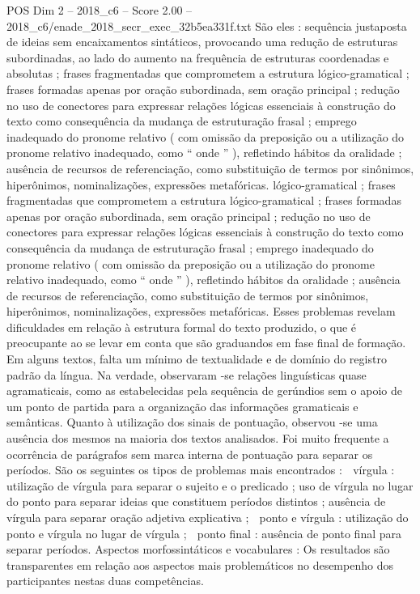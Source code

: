 \begin{textsample}{POS Dim 2 – 2018\_c6 – Score 2.00 – 2018\_c6/enade\_2018\_secr\_exec\_32b5ea331f.txt}
São eles : sequência justaposta de ideias sem encaixamentos sintáticos, provocando uma redução de estruturas subordinadas, ao lado do aumento na frequência de estruturas coordenadas e absolutas ; frases fragmentadas que comprometem a estrutura lógico-gramatical ; frases formadas apenas por oração subordinada, sem oração principal ; redução no uso de conectores para expressar relações lógicas essenciais à construção do texto como consequência da mudança de estruturação frasal ; emprego inadequado do pronome relativo ( com omissão da preposição ou a utilização do pronome relativo inadequado, como “ onde ” ), refletindo hábitos da oralidade ; ausência de recursos de referenciação, como substituição de termos por sinônimos, hiperônimos, nominalizações, expressões metafóricas. lógico-gramatical ; frases fragmentadas que comprometem a estrutura lógico-gramatical ; frases formadas apenas por oração subordinada, sem oração principal ; redução no uso de conectores para expressar relações lógicas essenciais à construção do texto como consequência da mudança de estruturação frasal ; emprego inadequado do pronome relativo ( com omissão da preposição ou a utilização do pronome relativo inadequado, como “ onde ” ), refletindo hábitos da oralidade ; ausência de recursos de referenciação, como substituição de termos por sinônimos, hiperônimos, nominalizações, expressões metafóricas.
Esses problemas revelam dificuldades em relação à estrutura formal do texto produzido, o que é preocupante ao se levar em conta que são graduandos em fase final de formação.
Em alguns textos, falta um mínimo de textualidade e de domínio do registro padrão da língua.
Na verdade, observaram -se relações linguísticas quase agramaticais, como as estabelecidas pela sequência de gerúndios sem o apoio de um ponto de partida para a organização das informações gramaticais e semânticas.
Quanto à utilização dos sinais de pontuação, observou -se uma ausência dos mesmos na maioria dos textos analisados.
Foi muito frequente a ocorrência de parágrafos sem marca interna de pontuação para separar os períodos.
São os seguintes os tipos de problemas mais encontrados :  vírgula : utilização de vírgula para separar o sujeito e o predicado ; uso de vírgula no lugar do ponto para separar ideias que constituem períodos distintos ; ausência de vírgula para separar oração adjetiva explicativa ;  ponto e vírgula : utilização do ponto e vírgula no lugar de vírgula ;  ponto final : ausência de ponto final para separar períodos.
Aspectos morfossintáticos e vocabulares : Os resultados são transparentes em relação aos aspectos mais problemáticos no desempenho dos participantes nestas duas competências.

\end{textsample}
